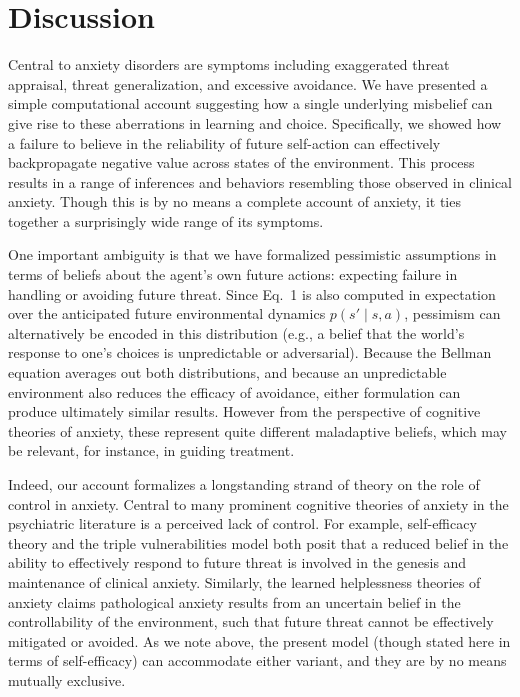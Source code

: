\documentclass[11pt]{article} %
\begin{document}
\section{Discussion}

Central to anxiety disorders are symptoms including exaggerated threat appraisal, threat generalization, and excessive avoidance. We have presented a simple computational account suggesting how a single underlying misbelief can give rise to these aberrations in learning and choice. Specifically, we showed how a failure to believe in the reliability of future self-action can effectively backpropagate negative value across states of the environment. This process results in a range of inferences and behaviors resembling those observed in clinical anxiety. Though this is by no means a complete account of anxiety, it ties together a surprisingly wide range of its symptoms.

One important ambiguity is that we have formalized pessimistic assumptions in terms of beliefs about the agent's own future actions: expecting failure in handling or avoiding future threat. Since Eq.~1 is also computed in expectation over the anticipated future environmental dynamics $p(s' \mid s,a)$, pessimism can alternatively be encoded in this distribution (e.g., a belief that the world's response to one's choices is unpredictable or adversarial). Because the Bellman equation averages out both distributions, and because an unpredictable environment also reduces the efficacy of avoidance, either formulation can produce ultimately similar results. However from the perspective of cognitive theories of anxiety, these represent quite different maladaptive beliefs, which may be relevant, for instance, in guiding treatment.

Indeed, our account formalizes a longstanding strand of theory on the role of control in anxiety. Central to many prominent cognitive theories of anxiety in the psychiatric literature is a perceived lack of control. For example, self-efficacy theory\citep{bandura1977} and the triple vulnerabilities model\citep{barlow2002} both posit that a reduced belief in the ability to effectively respond to future threat is involved in the genesis and maintenance of clinical anxiety. Similarly, the learned helplessness theories of anxiety\cite{alloy1990} claims pathological anxiety results from an uncertain belief in the controllability of the environment, such that future threat cannot be effectively mitigated or avoided. As we note above, the present model (though stated here in terms of self-efficacy) can accommodate either variant, and they are by no means mutually exclusive.
\end{document}
